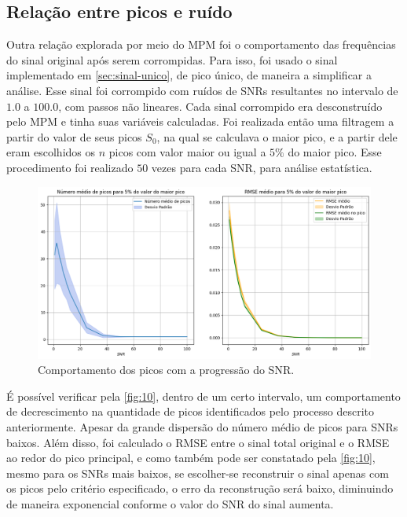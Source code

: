 \documentclass[12pt]{article}
\begin{document}
\subsection{Relação entre picos e ruído}

Outra relação explorada por meio do MPM foi o comportamento das frequências do sinal original após serem corrompidas. Para isso, foi usado o sinal implementado em
\autoref{sec:sinal-unico}, de pico único, de maneira a simplificar a análise. Esse sinal foi corrompido com ruídos de SNRs resultantes no intervalo de 
$1.0$ a $100.0$, com passos não lineares. Cada sinal corrompido era desconstruído pelo MPM e tinha suas variáveis calculadas. Foi realizada então uma filtragem a 
partir do valor de seus picos $S_0$, na qual se calculava o maior pico, e a partir dele eram escolhidos os $n$ picos com valor maior ou igual a $5\%$ do maior pico. 
Esse procedimento foi realizado $50$ vezes para cada SNR, para análise estatística.

\begin{figure} [H]
    \centering
    \includegraphics[scale=0.5]{picos.png}
    \caption{Comportamento dos picos com a progressão do SNR.}
    \label{fig:10}
\end{figure}
 
É possível verificar pela \autoref{fig:10}, dentro de um certo intervalo, um comportamento de decrescimento na quantidade de picos identificados pelo processo descrito 
anteriormente. Apesar da grande dispersão do número médio de picos para SNRs baixos. Além disso, foi calculado o RMSE entre o sinal total original e o RMSE ao redor do 
pico principal, e como também pode ser constatado pela \autoref{fig:10}, mesmo para os SNRs mais baixos, se escolher-se reconstruir o sinal apenas com os picos pelo critério 
especificado, o erro da reconstrução será baixo, diminuindo de maneira exponencial conforme o valor do SNR do sinal aumenta.
\end{document}
